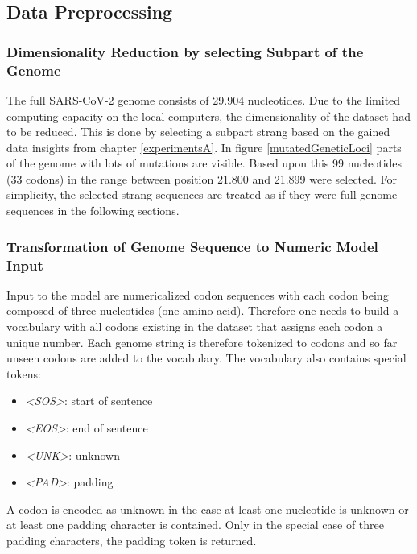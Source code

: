 \subsection{Data Preprocessing} \label{approachB}

\subsubsection{Dimensionality Reduction by selecting Subpart of the Genome} \label{approachBa}

The full \ac{SARS-CoV-2} genome consists of 29.904 nucleotides. Due to the limited computing capacity on the local computers, the dimensionality of the dataset had to be reduced. This is done by selecting a subpart strang based on the gained data insights from chapter \ref{experimentsA}. In figure \ref{mutatedGeneticLoci} parts of the genome with lots of mutations are visible. Based upon this 99 nucleotides (33 codons) in the range between position 21.800 and 21.899 were selected. For simplicity, the selected strang sequences are treated as if they were full genome sequences in the following sections.

\subsubsection{Transformation of Genome Sequence to Numeric Model Input} \label{approachBb}

Input to the model are numericalized codon sequences with each codon being composed of three nucleotides (one amino acid). Therefore one needs to build a vocabulary with all codons existing in the dataset that assigns each codon a unique number. Each genome string is therefore tokenized to codons and so far unseen codons are added to the vocabulary. The vocabulary also contains special tokens:

\begin{itemize}
	\item \textit{<SOS>}: start of sentence
	\item \textit{<EOS>}: end of sentence
	\item \textit{<UNK>}: unknown
	\item \textit{<PAD>}: padding
\end{itemize}

A codon is encoded as unknown in the case at least one nucleotide is unknown or at least one padding character is contained. Only in the special case of three padding characters, the padding token is returned. 

